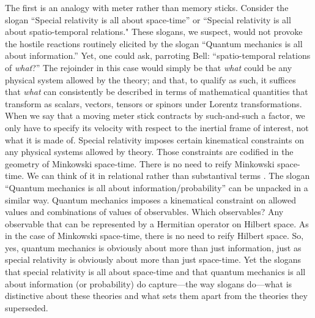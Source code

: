 The first is an analogy with meter rather than memory sticks. Consider the slogan ``Special relativity is all about space-time'' or ``Special relativity is all about spatio-temporal relations." These slogans, we suspect, would not provoke the hostile reactions routinely elicited by the slogan ``Quantum mechanics is all about information.'' Yet, one could ask, parroting Bell: ``spatio-temporal relations of \emph{what}?'' The rejoinder in this case would simply be that \emph{what} could be any physical system allowed by the theory; and that, to qualify as such, it suffices that \emph{what} can consistently be described in terms of mathematical quantities that transform as scalars, vectors, tensors or spinors under Lorentz transformations. When we say that a moving meter stick contracts by such-and-such a factor, we only have to specify its velocity with respect to the inertial frame of interest, not what it is made of. Special relativity imposes certain kinematical constraints on any physical systems allowed by theory. Those constraints are codified in the geometry of Minkowski space-time. There is no need to reify Minkowski space-time. We can think of it in relational rather than substantival  terms \citep{Janssen 2009}. The slogan ``Quantum mechanics is all about information/probability'' can be unpacked in a similar way. Quantum mechanics imposes a kinematical constraint on allowed values and combinations of values of observables. Which observables? Any observable that can be represented by a Hermitian operator on Hilbert space. As in the case of Minkowski space-time, there is no need to reify Hilbert space. So, yes, quantum mechanics is obviously about more than just information, just as special relativity is obviously about more than just space-time. Yet the slogans that special relativity is all about space-time and that quantum mechanics is all about information (or probability) do capture---the way slogans do---what is distinctive about these theories and what sets them apart from the theories they superseded.

